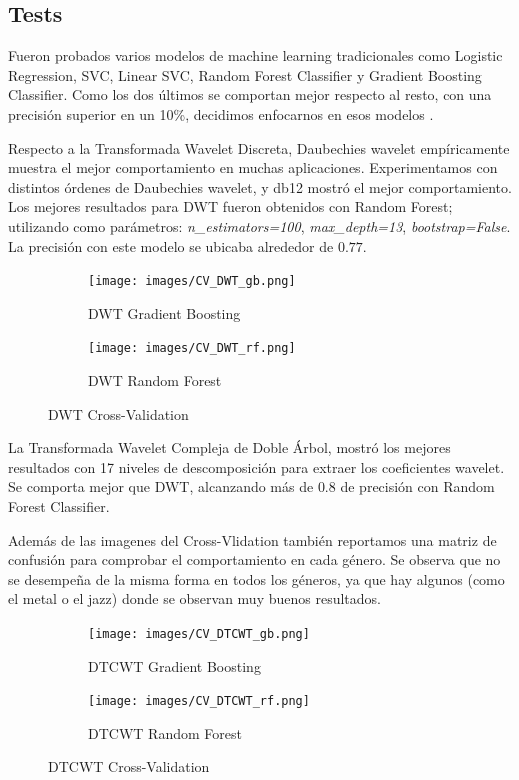 \documentclass[colorinlistoftodos,twoside,twocolumn,10pt]{article} %
\begin{document}
	\subsection{Tests}

  Fueron probados varios modelos de machine learning tradicionales como Logistic Regression, SVC, Linear SVC, Random Forest Classifier y Gradient Boosting Classifier. Como los dos últimos se comportan mejor respecto al resto, con una precisi\'on superior en un 10\%, decidimos enfocarnos en esos modelos . 

Respecto a la Transformada Wavelet Discreta, Daubechies wavelet  empíricamente muestra el mejor comportamiento en muchas aplicaciones\cite{Wavelet Transform for Music Genre Classification}. Experimentamos con distintos órdenes de Daubechies wavelet, y db12 mostró el mejor comportamiento. Los mejores resultados para DWT fueron obtenidos con Random Forest; utilizando como parámetros: \emph{n\_estimators=100}, \emph{max\_depth=13}, \emph{bootstrap=False}. La precisión con este modelo se ubicaba alrededor de $0.77$. \\

	\begin{figure}[h!] %
		\centering
		\begin{subfigure}{0.45\linewidth} %
			\texttt{[image: images/CV\_DWT\_gb.png]}
			\caption{DWT Gradient Boosting}
		\end{subfigure}
		\begin{subfigure}{0.45\linewidth} %
			\texttt{[image: images/CV\_DWT\_rf.png]}
			\caption{DWT Random Forest}
		\end{subfigure}
		\caption{DWT Cross-Validation}
	\end{figure}

La Transformada Wavelet Compleja de Doble Árbol, mostró los mejores resultados con 17 niveles de descomposición para extraer los coeficientes wavelet. Se comporta mejor que DWT, alcanzando más de $0.8$ de precisión con Random Forest Classifier.  

Además de las imagenes del Cross-Vlidation también reportamos una matriz de confusión para comprobar el comportamiento en cada género. Se observa que no se desempeña de la misma forma en todos los géneros, ya que hay algunos (como el metal o el jazz) donde se observan muy buenos resultados. \\

	\begin{figure}[h!] %
		\centering
		\begin{subfigure}{0.45\linewidth} %
			\texttt{[image: images/CV\_DTCWT\_gb.png]}                   
			\caption{DTCWT Gradient Boosting}
		\end{subfigure}
		\begin{subfigure}{0.45\linewidth} %
			\texttt{[image: images/CV\_DTCWT\_rf.png]}                  
			\caption{DTCWT Random Forest}
		\end{subfigure}
		\caption{DTCWT Cross-Validation}
	\end{figure}
\end{document}

